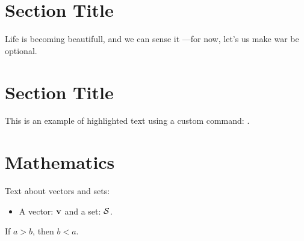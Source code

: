 \section{Section Title}
Life is becoming beautifull, and we can sense it ---for now, let's us make war be optional. 

\section{Section Title}
This is an example of highlighted text using a custom command: .

\section{Mathematics}
Text about vectors and sets:
\begin{itemize}
    \item A vector: $\mathbf{v}$ and a set: $\mathcal{S}$.
\end{itemize}

\begin{theorem}
If \( a > b \), then \( b < a \).
\end{theorem}
